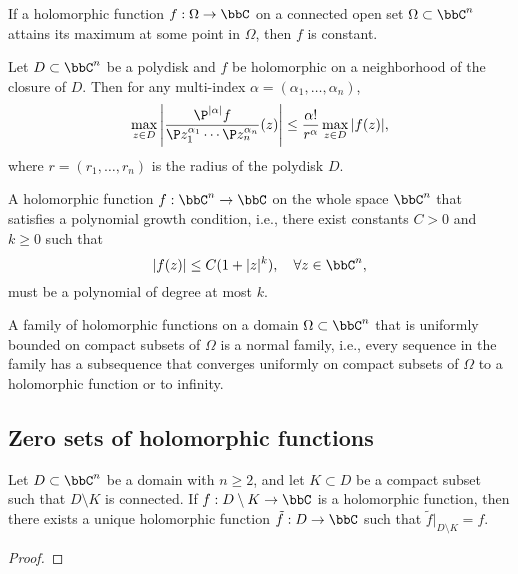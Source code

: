    \begin{proposition}\label{prop:rigidity_of_holomorphic_functions}
        If a holomorphic function \(f: \Omega \to \bbC\) on a connected open set \(\Omega \subset \bbC^n\) attains its maximum at some point in \(\Omega\), then \(f\) is constant.
    \end{proposition}

    \begin{proposition}\label{prop:Cauchy_estimates}
        Let \(D \subset \bbC^n\) be a polydisk and \(f\) be holomorphic on a neighborhood of the closure of \(D\). Then for any multi-index \(\alpha = (\alpha_1, \ldots, \alpha_n)\),
        \[ \max_{z \in D} \left| \frac{\P^{|\alpha|} f}{\P z_1^{\alpha_1} \cdots \P z_n^{\alpha_n}}(z) \right| \leq \frac{\alpha!}{r^\alpha} \max_{z \in D} |f(z)|, \]
        where \(r = (r_1, \ldots, r_n)\) is the radius of the polydisk \(D\).
    \end{proposition}

    \begin{theorem}\label{thm:generalized_Liouville_Theorem}
        A holomorphic function \(f: \bbC^n \to \bbC\) on the whole space \(\bbC^n\) that satisfies a polynomial growth condition, i.e., there exist constants \(C > 0\) and \(k \geq 0\) such that 
        \[ |f(z)| \leq C(1 + |z|^k), \quad \forall z \in \bbC^n, \]
        must be a polynomial of degree at most \(k\).
    \end{theorem}

    \begin{theorem}\label{thm:Montel's_Theorem}
        A family of holomorphic functions on a domain \(\Omega \subset \bbC^n\) that is uniformly bounded on compact subsets of \(\Omega\) is a normal family, i.e., every sequence in the family has a subsequence that converges uniformly on compact subsets of \(\Omega\) to a holomorphic function or to infinity.
    \end{theorem}

\subsection{Zero sets of holomorphic functions}

    \begin{theorem}\label{thm:Hartogs'_Extension_Theorem}
        Let \(D \subset \bbC^n\) be a domain with \(n \geq 2\), and let \(K \subset D\) be a compact subset such that \(D \setminus K\) is connected. 
        If \(f: D \setminus K \to \bbC\) is a holomorphic function, then there exists a unique holomorphic function \(\tilde{f}: D \to \bbC\) such that \(\tilde{f}|_{D \setminus K} = f\).
    \end{theorem}
    \begin{proof}
    \end{proof}

